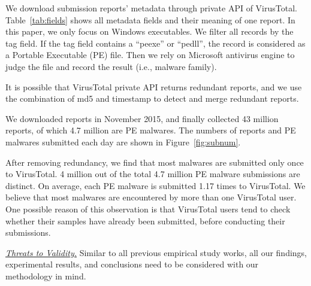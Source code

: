 We download submission reports' metadata through private API of VirusTotal. Table~\ref{tab:fields} shows all metadata fields and their meaning of one report. In this paper, we only focus on Windows executables. We filter all records by the tag field. If the tag field contains a ``peexe'' or ``pedll'', the record is considered as a Portable Executable (PE) file. Then we rely on Microsoft antivirus engine to judge the file and record the result (i.e., malware family). 

It is possible that VirusTotal private API returns redundant reports, 
and we use the combination of md5 and timestamp to detect and merge redundant reports.

We downloaded reports in November 2015, and finally collected 43 million reports, of which 4.7 million are PE malwares. 
The numbers of reports and PE malwares submitted each day are shown in Figure~\ref{fig:subnum}.


After removing redundancy, we find that most malwares are submitted only once to VirusTotal. 4 million out of the total 4.7 million PE malware submissions are distinct. On average, each PE malware is submitted 1.17 times to VirusTotal. We believe that most malwares are encountered by more than one VirusTotal user. One possible reason of this observation is that VirusTotal users 
tend to check whether their samples have already been submitted, 
before conducting their submissions.

\textit{\underline{Threats to Validity.}}
Similar to all previous empirical study works, all our findings, experimental results, 
and conclusions need to be considered with our methodology in mind. 

